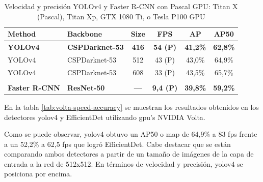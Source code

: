 \begin{table}[ht]
\centering
\caption{Velocidad y precisión YOLOv4 y Faster R-CNN con Pascal GPU: Titan X (Pascal), Titan Xp, GTX 1080 Ti, o Tesla P100 GPU \cite{bochkovskiy2020yolov4} \cite{ren2016faster}}
\label{tab:pascal-speed-accuracy}
\begin{tabular}{llcccc}
\hline
\textbf{Method}       & \textbf{Backbone}      & \textbf{Size} & \textbf{FPS}     & \textbf{AP}     & \textbf{AP50}   \\ \hline
\textbf{YOLOv4}       & \textbf{CSPDarknet-53} & \textbf{416}  & \textbf{54 (P)}  & \textbf{41,2\%} & \textbf{62,8\%} \\
YOLOv4                & CSPDarknet-53          & 512           & 43 (P)           & 43,0\%          & 64,9\%          \\
YOLOv4                & CSPDarknet-53          & 608           & 33 (P)           & 43,5\%          & 65,7\%          \\
                      &                        &               &                  &                 &                 \\
\textbf{Faster R-CNN} & \textbf{ResNet-50}     & \textbf{—}    & \textbf{9,4 (P)} & \textbf{39,8\%} & \textbf{59,2\%} \\ \hline
\end{tabular}
\end{table}

En la tabla \ref{tab:volta-speed-accuracy} se muestran los resultados obtenidos en los detectores \gls{yolov4} y EfficientDet utilizando \gls{gpu}'s NVIDIA Volta.

Como se puede observar, \gls{yolov4} obtuvo un AP50 o \gls{map} de 64,9\% a 83 \gls{fps} frente a un 52,2\% a 62,5 \gls{fps} que logró EfficientDet. Cabe destacar que se están comparando ambos detectores a partir de un tamaño de imágenes de la capa de entrada a la red de 512x512. En términos de velocidad y precisión, \gls{yolov4} se posiciona por encima.

